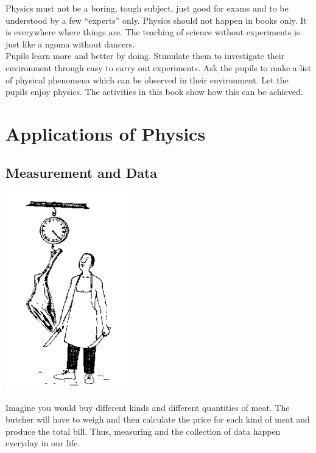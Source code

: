 \begin{multicols}{2}
Physics must not be a boring, tough subject, just good for exams and to be understood by a
few ``experts'' only. Physics should not happen in books only. It is everywhere where things
are. The teaching of science without experiments is just like a ngoma without dancers.\\

Pupils learn more and better by doing. Stimulate them to investigate their environment
through easy to carry out experiments. Ask the pupils to make a list of physical phenomena
which can be observed in their environment. Let the pupils enjoy physics. The activities in this book
show how this can be achieved.

\vfill
\columnbreak



\section*{Applications of Physics} 


\subsection{Measurement and Data} 

\begin{center}
\includegraphics[width=0.4\textwidth]{./img/source/butcher.png}
\end{center}

Imagine you would buy different kinds and different quantities of meat. The butcher will have
to weigh and then calculate the price for each kind of meat and produce the total bill. Thus,
measuring and the collection of data happen everyday in our life.\\


\end{multicols}
